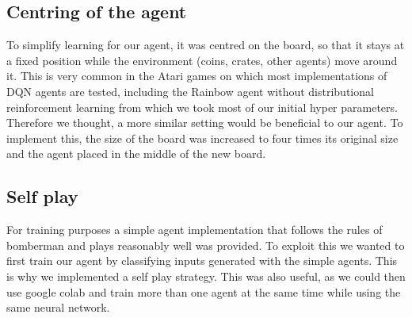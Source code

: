 \documentclass[12pt]{article}
\begin{document}
\subsection{Centring of the agent}
To simplify learning for our agent, it was centred on the board, so that it stays at a fixed position while the environment (coins, crates, other agents) move around it. This is very common in the Atari games on which most implementations of DQN agents are tested, including the Rainbow agent without distributional reinforcement learning from which we took most of our initial hyper parameters. Therefore we thought, a more similar setting would be beneficial to our agent. To implement this, the size of the board was increased to four times its original size and the agent placed in the middle of the new board.
\subsection{Self play}
For training purposes a simple agent implementation that follows the rules of bomberman and plays reasonably well was provided.
To exploit this we wanted to first train our agent by classifying inputs generated with the simple agents. %
This is why we implemented a self play strategy. This was also useful, as we could then use google colab and train more than one agent at the same time while using the same neural network.



\printbibliography
\end{document}

